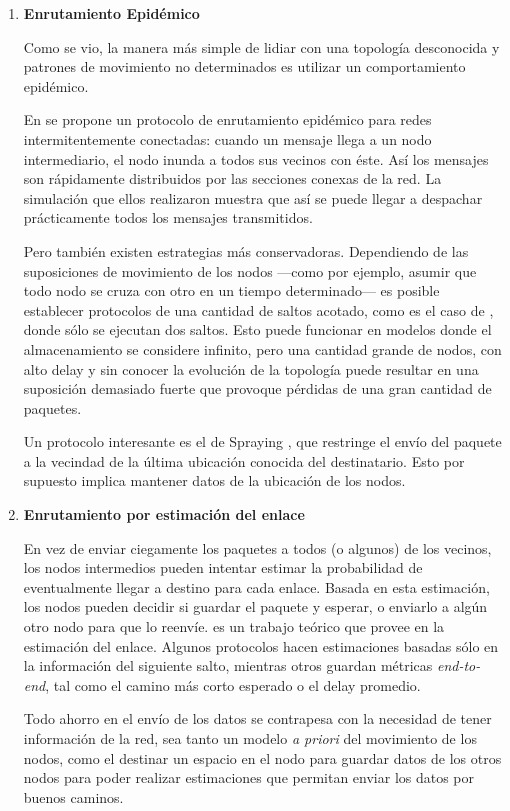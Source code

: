 \documentclass[10pt,preprint,onecolumn]{article}
\begin{document}
\begin{enumerate}
\item \textbf{Enrutamiento Epidémico}

Como se vio, la manera más simple de lidiar con una topología desconocida y patrones de movimiento no determinados es utilizar un comportamiento epidémico.

En \cite{epidemic} se propone un protocolo de enrutamiento epidémico para redes intermitentemente conectadas: cuando un mensaje llega a un nodo intermediario, el nodo inunda a todos sus vecinos con éste. Así los mensajes son rápidamente distribuidos por las secciones conexas de la red. La simulación que ellos realizaron muestra que así se puede llegar a despachar prácticamente todos los mensajes transmitidos.

Pero también existen estrategias más conservadoras. Dependiendo de las suposiciones de movimiento de los nodos ---como por ejemplo, asumir que todo nodo se cruza con otro en un tiempo determinado--- es posible establecer protocolos de una cantidad de saltos acotado, como es el caso de \cite{teo2}, donde sólo se ejecutan dos saltos. Esto puede funcionar en modelos donde el almacenamiento se considere infinito, pero una cantidad grande de nodos, con alto delay y sin conocer la evolución de la topología puede resultar en una suposición demasiado fuerte que provoque pérdidas de una gran cantidad de paquetes.

Un protocolo interesante es el de Spraying \cite{24}, que restringe el envío del paquete a la vecindad de la última ubicación conocida del destinatario. Esto por supuesto implica mantener datos de la ubicación de los nodos.

\item \textbf{Enrutamiento por estimación del enlace}

En vez de enviar ciegamente los paquetes a todos (o algunos) de los vecinos, los nodos intermedios pueden intentar estimar la probabilidad de eventualmente llegar a destino para cada enlace. Basada en esta estimación, los nodos pueden decidir si guardar el paquete y esperar, o enviarlo a algún otro nodo para que lo reenvíe. \cite{49} es un trabajo teórico que provee en la estimación del enlace. Algunos protocolos hacen estimaciones basadas sólo en la información  del siguiente salto\cite{26}, mientras otros guardan métricas \emph{end-to-end}, tal como el camino más corto esperado o el delay promedio.

Todo ahorro en el envío de los datos se contrapesa con la necesidad de tener información de la red, sea tanto un modelo \emph{a priori} del movimiento de los nodos, como el destinar un espacio en el nodo para guardar datos de los otros nodos para poder realizar estimaciones que permitan enviar los datos por buenos caminos. 
\end{enumerate}
\end{document}
